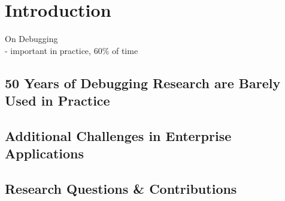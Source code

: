 \chapter{Introduction}
\label{sec:introduction}

On Debugging
\\- important in practice, 60\% of time 


\section{50 Years of Debugging Research are Barely Used in Practice}

\section{Additional Challenges in Enterprise Applications}

\section{Research Questions \& Contributions}
